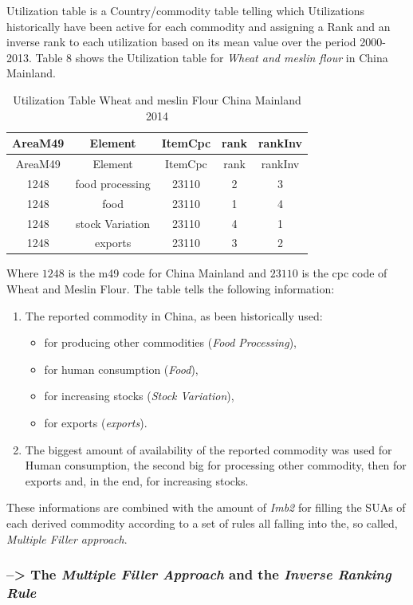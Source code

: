 \documentclass[]{article}
\providecommand{\tightlist}{%
  \setlength{\itemsep}{0pt}\setlength{\parskip}{0pt}}
\begin{document}
Utilization table is a Country/commodity table telling which
Utilizations historically have been active for each commodity and
assigning a Rank and an inverse rank to each utilization based on its
mean value over the period 2000-2013. Table 8 shows the Utilization
table for \emph{Wheat and meslin flour} in China Mainland.

\begin{longtable}[]{@{}ccccc@{}}
\caption{Utilization Table Wheat and meslin Flour China Mainland
2014}\tabularnewline
\toprule
AreaM49 & Element & ItemCpc & rank & rankInv\tabularnewline
\midrule
\endfirsthead
\toprule
AreaM49 & Element & ItemCpc & rank & rankInv\tabularnewline
\midrule
\endhead
1248 & food processing & 23110 & 2 & 3\tabularnewline
1248 & food & 23110 & 1 & 4\tabularnewline
1248 & stock Variation & 23110 & 4 & 1\tabularnewline
1248 & exports & 23110 & 3 & 2\tabularnewline
\bottomrule
\end{longtable}

Where \(1248\) is the m49 code for China Mainland and \(23110\) is the
cpc code of Wheat and Meslin Flour. The table tells the following
information:

\begin{enumerate}
\def\labelenumi{\arabic{enumi}.}
\tightlist
\item
  The reported commodity in China, as been historically used:

  \begin{itemize}
  \tightlist
  \item
    for producing other commodities (\emph{Food Processing}),
  \item
    for human consumption (\emph{Food}),
  \item
    for increasing stocks (\emph{Stock Variation}),
  \item
    for exports (\emph{exports}).
  \end{itemize}
\item
  The biggest amount of availability of the reported commodity was used
  for Human consumption, the second big for processing other commodity,
  then for exports and, in the end, for increasing stocks.
\end{enumerate}

These informations are combined with the amount of \emph{Imb2} for
filling the SUAs of each derived commodity according to a set of rules
all falling into the, so called, \emph{Multiple Filler approach}.

\subsubsection*{\texorpdfstring{--\textgreater{} The \emph{Multiple
Filler Approach} and the \emph{Inverse Ranking
Rule}}{--\textgreater{} The Multiple Filler Approach and the Inverse Ranking Rule}}\label{the-multiple-filler-approach-and-the-inverse-ranking-rule}
\end{document}
